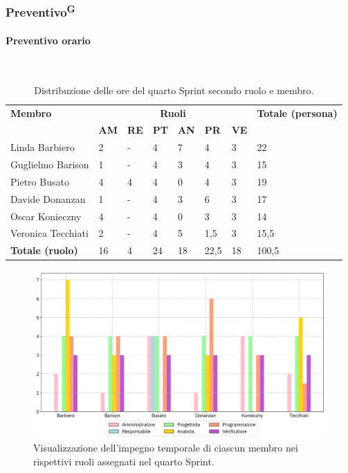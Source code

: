 \documentclass[8pt]{article}
\newcommand{\glossterm}[1]{#1\textsuperscript{G}} %
\newcommand{\subsubsubsection}[1]{\paragraph{#1}\mbox{}\\}
\begin{document}
\subsubsection{\glossterm{Preventivo}}
\subsubsubsection{Preventivo orario}
\begin{table}[ht!]
	\centering
	\begin{tabular}{p{4cm} p{1cm} p{1cm} p{1cm} p{1cm} p{1cm} p{1cm} p{3cm}}
		\toprule
        \textbf{Membro} & \multicolumn{6}{c}{\textbf{Ruoli}} & \textbf{Totale (persona)}\\
		& \textbf{AM} & \textbf{RE} & \textbf{PT} & \textbf{AN} & \textbf{PR} & \textbf{VE}\\
		\midrule
        Linda Barbiero          & 2     & -     & 4     & 7     & 4     & 3     & 22 \\
        Guglielmo Barison       & 1     & -     & 4     & 3     & 4     & 3     & 15\\
        Pietro Busato           & 4     & 4     & 4     & 0     & 4     & 3     & 19 \\
        Davide Donanzan         & 1     & -     & 4     & 3     & 6     & 3     & 17 \\
        Oscar Konieczny         & 4     & -     & 4     & 0     & 3     & 3     & 14 \\
        Veronica Tecchiati      & 2     & -     & 4     & 5     & 1,5   & 3     & 15,5 \\
        \bottomrule
        \textbf{Totale (ruolo)} & 16    & 4     & 24    & 18    & 22,5  & 18   & 100,5 \\
	\end{tabular}
	\caption{Distribuzione delle ore del quarto Sprint secondo ruolo e membro.}
	\label{table:Distribuzione delle ore del quarto Sprint secondo ruolo e membro}
\end{table}
\begin{figure}[ht!]
    \centering
    \includegraphics[width=15cm]{./images_pdp/istogramma_periodo_4.png}
    \caption{Visualizzazione dell’impegno temporale di ciascun membro nei rispettivi ruoli assegnati
    nel quarto Sprint.}
    \label{figure:Visualizzazione dell’impegno temporale di ciascun membro nei rispettivi ruoli
    assegnati nel quarto Sprint}
\end{figure}
\end{document}
